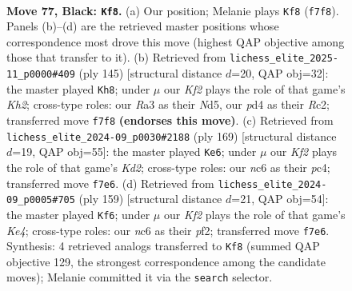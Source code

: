 \documentclass[11pt]{article}
\begin{document}
\clearpage

\begin{figure}[p]\centering
\begin{subfigure}{0.46\textwidth}\centering
\resizebox{\linewidth}{!}{%
\newchessgame
\chessboard[
  setfen={8/3R1kp1/2N2p2/7p/3P3P/r5P1/5K2/8 b - - 48 77},
  showmover=false,
  pgfstyle=straightmove, color=movearrow, markmove={f7-f8}
]}
\caption{}
\end{subfigure}\hfill
\begin{subfigure}{0.46\textwidth}\centering
\resizebox{\linewidth}{!}{%
\newchessgame
\chessboard[
  setfen={8/R6k/4N1pp/2pn4/6P1/6KP/P1r5/8 b - - 7 73},
  showmover=false,
  pgfstyle=straightmove, color=movearrow, markmove={h7-h8}
]}
\caption{}
\end{subfigure}
\\[4pt]
\begin{subfigure}{0.46\textwidth}\centering
\resizebox{\linewidth}{!}{%
\newchessgame
\chessboard[
  setfen={8/R2k4/3p4/P1p5/2P2p2/2r2P2/4KP2/8 b - - 2 85},
  showmover=false,
  pgfstyle=straightmove, color=movearrow, markmove={d7-e6}
]}
\caption{}
\end{subfigure}\hfill
\begin{subfigure}{0.46\textwidth}\centering
\resizebox{\linewidth}{!}{%
\newchessgame
\chessboard[
  setfen={8/8/8/1R2kpp1/p7/P6P/1P1r1P1K/8 b - - 84 80},
  showmover=false,
  pgfstyle=straightmove, color=movearrow, markmove={e5-f6}
]}
\caption{}
\end{subfigure}
\caption{\textbf{Move 77, Black: \texttt{Kf8}.} (a) Our position; Melanie plays \texttt{Kf8} (\texttt{f7f8}). Panels (b)--(d) are the retrieved master positions whose correspondence most drove this move (highest QAP objective among those that transfer to it). (b) Retrieved from \texttt{lichess\_elite\_2025-11\_p0000\#409} (ply 145) [structural distance $d$=20, QAP obj=32]: the master played \texttt{Kh8}; under $\mu$ our \emph{Kf2} plays the role of that game's \emph{Kh2}; cross-type roles: our \emph{R}a3 as their \emph{N}d5, our \emph{p}d4 as their \emph{R}c2; transferred move \texttt{f7f8} \textbf{(endorses this move)}. (c) Retrieved from \texttt{lichess\_elite\_2024-09\_p0030\#2188} (ply 169) [structural distance $d$=19, QAP obj=55]: the master played \texttt{Ke6}; under $\mu$ our \emph{Kf2} plays the role of that game's \emph{Kd2}; cross-type roles: our \emph{n}c6 as their \emph{p}c4; transferred move \texttt{f7e6}. (d) Retrieved from \texttt{lichess\_elite\_2024-09\_p0005\#705} (ply 159) [structural distance $d$=21, QAP obj=54]: the master played \texttt{Kf6}; under $\mu$ our \emph{Kf2} plays the role of that game's \emph{Ke4}; cross-type roles: our \emph{n}c6 as their \emph{p}f2; transferred move \texttt{f7e6}. Synthesis: 4 retrieved analogs transferred to \texttt{Kf8} (summed QAP objective 129, the strongest correspondence among the candidate moves); Melanie committed it via the \texttt{search} selector.}
\label{fig:thought-m153}
\end{figure}
\end{document}
